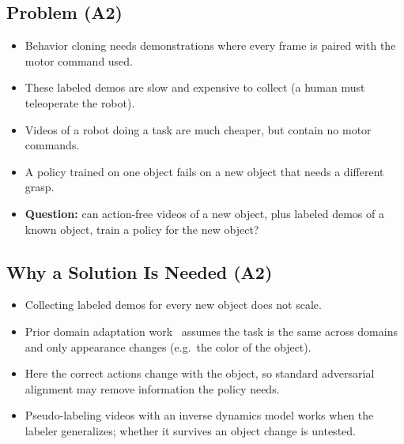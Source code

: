 \documentclass[11pt]{article}
\begin{document}
\subsection{Problem (A2)}
\begin{itemize}
  \item Behavior cloning needs demonstrations where every frame is paired with
    the motor command used.
  \item These labeled demos are slow and expensive to collect (a human must
    teleoperate the robot).
  \item Videos of a robot doing a task are much cheaper, but contain no motor
    commands.
  \item A policy trained on one object fails on a new object that needs a
    different grasp.
  \item \textbf{Question:} can action-free videos of a new object, plus labeled
    demos of a known object, train a policy for the new object?
\end{itemize}

\subsection{Why a Solution Is Needed (A2)}
\begin{itemize}
  \item Collecting labeled demos for every new object does not scale.
  \item Prior domain adaptation work~\cite{cheng2025gda} assumes the task is
    the same across domains and only appearance changes (e.g.\ the color of the
    object).
  \item Here the correct actions change with the object, so standard
    adversarial alignment may remove information the policy needs.
  \item Pseudo-labeling videos with an inverse dynamics model works when the
    labeler generalizes; whether it survives an object change is untested.
\end{itemize}
\end{document}
